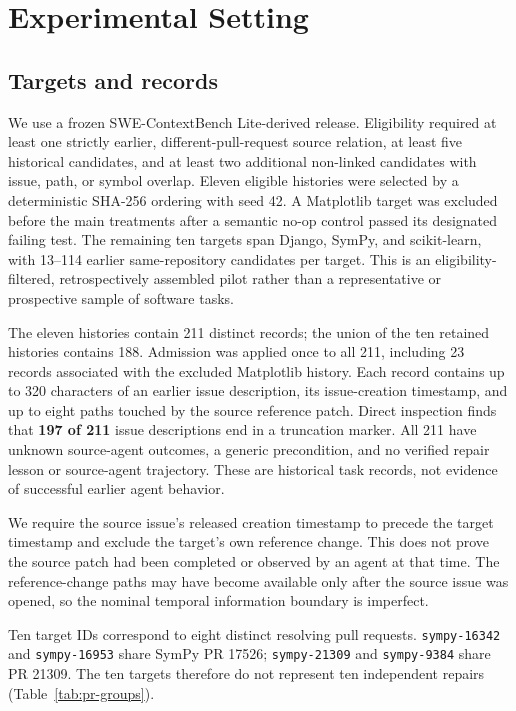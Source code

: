\documentclass[sigconf,anonymous]{aamas}
\begin{document}
\section{Experimental Setting}
\subsection{Targets and records}
We use a frozen SWE-ContextBench Lite-derived release. Eligibility required at least one strictly earlier, different-pull-request source relation, at least five historical candidates, and at least two additional non-linked candidates with issue, path, or symbol overlap. Eleven eligible histories were selected by a deterministic SHA-256 ordering with seed 42. A Matplotlib target was excluded before the main treatments after a semantic no-op control passed its designated failing test. The remaining ten targets span Django, SymPy, and scikit-learn, with 13--114 earlier same-repository candidates per target. This is an eligibility-filtered, retrospectively assembled pilot rather than a representative or prospective sample of software tasks.

The eleven histories contain 211 distinct records; the union of the ten retained histories contains 188. Admission was applied once to all 211, including 23 records associated with the excluded Matplotlib history. Each record contains up to 320 characters of an earlier issue description, its issue-creation timestamp, and up to eight paths touched by the source reference patch. Direct inspection finds that \textbf{197 of 211} issue descriptions end in a truncation marker. All 211 have unknown source-agent outcomes, a generic precondition, and no verified repair lesson or source-agent trajectory. These are historical task records, not evidence of successful earlier agent behavior.

We require the source issue's released creation timestamp to precede the target timestamp and exclude the target's own reference change. This does not prove the source patch had been completed or observed by an agent at that time. The reference-change paths may have become available only after the source issue was opened, so the nominal temporal information boundary is imperfect.

Ten target IDs correspond to eight distinct resolving pull requests. \texttt{sympy-16342} and \texttt{sympy-16953} share SymPy PR 17526; \texttt{sympy-21309} and \texttt{sympy-9384} share PR 21309. The ten targets therefore do not represent ten independent repairs (Table~\ref{tab:pr-groups}).
\end{document}
